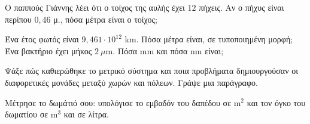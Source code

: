 \ex Ο παππούς Γιάννης λέει ότι ο τοίχος της αυλής έχει $12$ πήχεις. Αν ο πήχυς είναι περίπου $0{,}46$ μ., πόσα μέτρα είναι ο τοίχος;

\ex Ένα έτος φωτός είναι $9{,}461\cdot10^{12}$ km. Πόσα μέτρα είναι, σε τυποποιημένη μορφή; Ένα βακτήριο έχει μήκος $2\ \mu\mathrm{m}$. Πόσα mm και πόσα nm είναι;


\ex Ψάξε πώς καθιερώθηκε το μετρικό σύστημα και ποια προβλήματα δημιουργούσαν οι διαφορετικές μονάδες μεταξύ χωρών και πόλεων. Γράψε μια παράγραφο.

\ex Μέτρησε το δωμάτιό σου: υπολόγισε το εμβαδόν του δαπέδου σε m$^2$ και τον όγκο του δωματίου σε m$^3$ και σε λίτρα.
